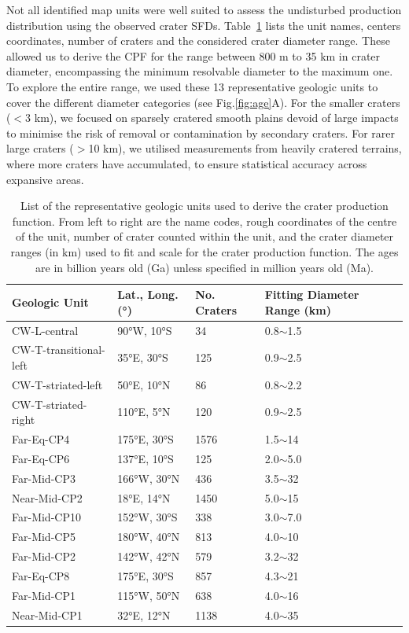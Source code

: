 \documentclass[preprint,11pt,3p,times,authoryear]{elsarticle}
\begin{document}
{%
Not all identified map units were well suited to assess the undisturbed production distribution using the observed crater SFDs. Table~\ref{tab:craters} lists the unit names, centers coordinates, number of craters and the considered crater diameter range. These allowed us to derive the CPF for the range between 800 m to 35 km in crater diameter, encompassing the minimum resolvable diameter to the maximum one.
To explore the entire range, we used these 13 representative geologic units to cover the different diameter categories (see Fig.\ref{fig:age}A). For the smaller craters ($<$3 km), we focused on sparsely cratered smooth plains devoid of large impacts to minimise the risk of removal or contamination by secondary craters. For rarer large craters ($>$10 km), we utilised measurements from heavily cratered terrains, where more craters have accumulated, to ensure statistical accuracy across expansive areas.\\

\begin{table}[t]
\centering
    \begin{tabular}{p{4.0cm} p{3.0cm} p{2.0cm} p{3.0cm}}
\hline
\textbf{Geologic Unit} & \textbf{Lat., Long. (°)} & \textbf{No. Craters} & \textbf{Fitting Diameter Range (km)} \\
\hline
CW-L-central & 90°W, 10°S & 34 & 0.8$\sim$1.5 \\
CW-T-transitional-left & 35°E, 30°S & 125 & 0.9$\sim$2.5 \\
CW-T-striated-left & 50°E, 10°N & 86 & 0.8$\sim$2.2 \\
CW-T-striated-right & 110°E, 5°N & 120 & 0.9$\sim$2.5 \\
Far-Eq-CP4 & 175°E, 30°S & 1576 & 1.5$\sim$14 \\
Far-Eq-CP6 & 137°E, 10°S & 125 & 2.0$\sim$5.0 \\
Far-Mid-CP3 & 166°W, 30°N & 436 & 3.5$\sim$32 \\
Near-Mid-CP2 & 18°E, 14°N & 1450 & 5.0$\sim$15 \\
Far-Mid-CP10 & 152°W, 30°S & 338 & 3.0$\sim$7.0 \\
Far-Mid-CP5 & 180°W, 40°N & 813 & 4.0$\sim$10 \\
Far-Mid-CP2 & 142°W, 42°N & 579 & 3.2$\sim$32 \\
Far-Eq-CP8 & 175°E, 30°S & 857 & 4.3$\sim$21 \\
Far-Mid-CP1 & 115°W, 50°N & 638 & 4.0$\sim$16 \\
Near-Mid-CP1 & 32°E, 12°N & 1138 & 4.0$\sim$35 \\
\hline
\end{tabular}
\caption{List of the representative geologic units used to derive the crater production function. From left to right are the name codes, rough coordinates of the centre of the unit, number of crater counted within the unit, and the crater diameter ranges (in km) used to fit and scale for the crater production function. The ages are in billion years old (Ga) unless specified in million years old (Ma).}
\label{tab:craters}
\end{table}

}
\end{document}
